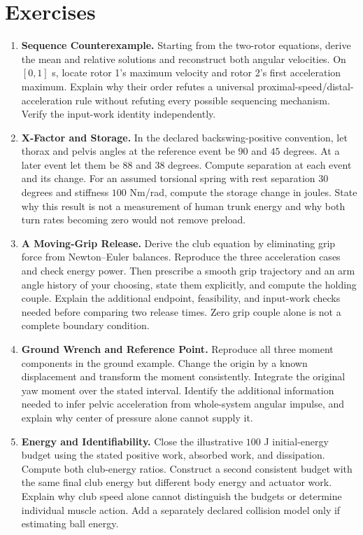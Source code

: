 \section{Exercises}
\begin{enumerate}
\item \textbf{Sequence Counterexample.} Starting from the two-rotor equations, derive the mean and relative solutions and reconstruct both angular velocities. On $[0,1]$ s, locate rotor 1's maximum velocity and rotor 2's first acceleration maximum. Explain why their order refutes a universal proximal-speed/distal-acceleration rule without refuting every possible sequencing mechanism. Verify the input-work identity independently.

\item \textbf{X-Factor and Storage.} In the declared backswing-positive convention, let thorax and pelvis angles at the reference event be $90$ and $45$ degrees. At a later event let them be $88$ and $38$ degrees. Compute separation at each event and its change. For an assumed torsional spring with rest separation $30$ degrees and stiffness $100$ Nm/rad, compute the storage change in joules. State why this result is not a measurement of human trunk energy and why both turn rates becoming zero would not remove preload.

\item \textbf{A Moving-Grip Release.} Derive the club equation by eliminating grip force from Newton--Euler balances. Reproduce the three acceleration cases and check energy power. Then prescribe a smooth grip trajectory and an arm angle history of your choosing, state them explicitly, and compute the holding couple. Explain the additional endpoint, feasibility, and input-work checks needed before comparing two release times. Zero grip couple alone is not a complete boundary condition.

\item \textbf{Ground Wrench and Reference Point.} Reproduce all three moment components in the ground example. Change the origin by a known displacement and transform the moment consistently. Integrate the original yaw moment over the stated interval. Identify the additional information needed to infer pelvic acceleration from whole-system angular impulse, and explain why center of pressure alone cannot supply it.

\item \textbf{Energy and Identifiability.} Close the illustrative $100$ J initial-energy budget using the stated positive work, absorbed work, and dissipation. Compute both club-energy ratios. Construct a second consistent budget with the same final club energy but different body energy and actuator work. Explain why club speed alone cannot distinguish the budgets or determine individual muscle action. Add a separately declared collision model only if estimating ball energy.


\end{enumerate}
